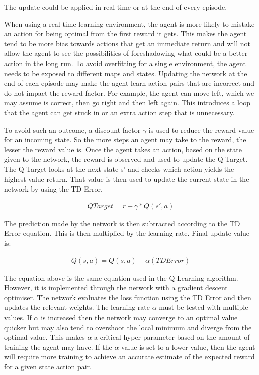 The update could be applied in real-time or at the end of every episode.

When using a real-time learning environment, the agent is more likely to mistake
an action for being optimal from the first reward it gets. This makes the agent
tend to be more bias towards actions that get an immediate return and will not
allow the agent to see the possibilities of foreshadowing what could be a better
action in the long run. To avoid overfitting for a single environment, the
agent needs to be exposed to different maps and states. Updating the network at
the end of each episode may make the agent learn action pairs that are
incorrect and do not impact the reward factor. For example, the agent can move
left, which we may assume is correct, then go right and then left again. This
introduces a loop that the agent can get stuck in or an extra action step that
is unnecessary.

To avoid such an outcome, a discount factor $\gamma$ is used to reduce
the reward value for an incoming state. So the more steps an agent may take to
the reward, the lesser the reward value is. Once the agent takes an action,
based on the state given to the network, the reward is observed and used to
update the Q-Target. The Q-Target looks at the next state s' and checks which
action yields the highest value return. That value is then used to update the
current state in the network by using the TD Error.

\begin{align}
    QTarget = r + \gamma*Q(s',a)
\end{align}

The prediction made by the network is then subtracted according to the TD Error
equation. This is then multiplied by the learning rate. Final update value
is:

\begin{align}
    Q(s,a) = Q(s,a) + \alpha (TDError)
\end{align}

The equation above is the same equation used in the Q-Learning algorithm.
However, it is
implemented through the network with a gradient descent optimiser. The network
evaluates the loss function using the TD Error and then updates the relevant
weights. The learning rate $\alpha$ must be tested with multiple values. If
$\alpha$ is increased then the network may converge to an optimal value quicker
but may also tend to overshoot the local minimum and diverge from the optimal
value. This makes $\alpha$ a critical hyper-parameter based on the amount of
training the agent may have. If the $\alpha$ value is set to a lower value, then
the agent will require more training to achieve an accurate estimate of the
expected reward for a given state action pair.

